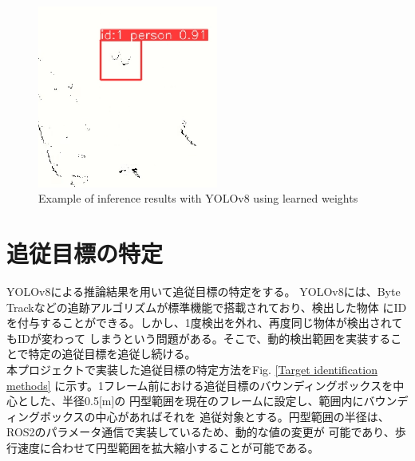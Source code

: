 \begin{figure}[h]
    \begin{center}
    \includegraphics[height=60mm,clip]{figure/yolov8_laser_img.png}
    \caption{Example of inference results with YOLOv8 using learned weights}
    \label{Example of inference results with YOLOv8 using learned weights}
    \end{center}
\end{figure}

\section{追従目標の特定}
YOLOv8による推論結果を用いて追従目標の特定をする。
YOLOv8には、Byte Trackなどの追跡アルゴリズムが標準機能で搭載されており、検出した物体
にIDを付与することができる。しかし、1度検出を外れ、再度同じ物体が検出されてもIDが変わって
しまうという問題がある。そこで、動的検出範囲を実装することで特定の追従目標を追従し続ける。\\ \indent
本プロジェクトで実装した追従目標の特定方法をFig. \ref{Target identification methods}
に示す。1フレーム前における追従目標のバウンディングボックスを中心とした、半径0.5[m]の
円型範囲を現在のフレームに設定し、範囲内にバウンディングボックスの中心があればそれを
追従対象とする。円型範囲の半径は、ROS2のパラメータ通信で実装しているため、動的な値の変更が
可能であり、歩行速度に合わせて円型範囲を拡大縮小することが可能である。

